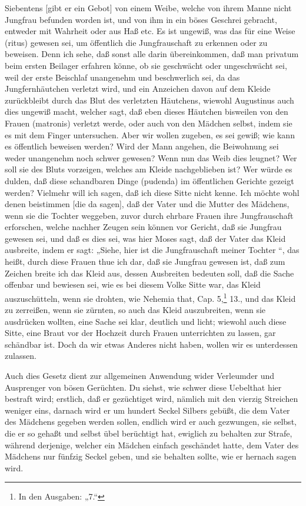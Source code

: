 Siebentens [gibt er ein Gebot] von einem Weibe, welche von ihrem Manne nicht Jungfrau befunden worden ist, und von ihm in ein böses Geschrei gebracht, entweder mit Wahrheit oder aus Haß etc. Es ist ungewiß, was das für eine Weise (ritus) gewesen sei, um öffentlich die Jungfrauschaft zu erkennen oder zu beweisen. Denn ich sehe, daß sonst alle darin übereinkommen, daß man privatum beim ersten Beilager erfahren könne, ob sie geschwächt oder ungeschwächt sei, weil der erste Beischlaf unangenehm und beschwerlich sei, da das Jungfernhäutchen verletzt wird, und ein Anzeichen davon auf dem Kleide zurückbleibt durch das Blut des verletzten Häutchens, wiewohl Augustinus auch dies ungewiß macht, welcher sagt, daß eben dieses Häutchen bisweilen von den Frauen (matronis) verletzt werde, oder auch von den Mädchen selbst, indem sie es mit dem Finger untersuchen. Aber wir wollen zugeben, es sei gewiß; wie kann es öffentlich beweisen werden? Wird der Mann angehen, die Beiwohnung sei weder unangenehm noch schwer gewesen? Wenn nun das Weib dies leugnet? Wer soll sie des Bluts vorzeigen, welches am Kleide nachgeblieben ist? Wer würde es dulden, daß diese schandbaren Dinge (pudenda) im öffentlichen Gerichte gezeigt werden? Vielmehr will ich sagen, daß ich diese Sitte nicht kenne. Ich möchte wohl denen beistimmen [die da sagen], daß der Vater und die Mutter des Mädchens, wenn sie die Tochter weggeben, zuvor durch ehrbare Frauen ihre Jungfrauschaft erforschen, welche nachher Zeugen sein können vor Gericht, daß sie Jungfrau gewesen sei, und daß es dies sei, was hier Moses sagt, daß der Vater das Kleid ausbreite, indem er sagt: „Siehe, hier ist die Jungfrauschaft meiner Tochter
“, das heißt, durch diese Frauen thue ich dar, daß sie Jungfrau gewesen ist, daß zum Zeichen breite ich das Kleid aus, dessen Ausbreiten bedeuten soll, daß die Sache offenbar und bewiesen sei, wie es bei diesem Volke Sitte war, das Kleid auszuschütteln, wenn sie drohten, wie Nehemia that, Cap. 5,\footnote{In den Ausgaben: „7.“} 13., und das Kleid zu zerreißen, wenn sie zürnten, so auch das Kleid auszubreiten, wenn sie ausdrücken wollten, eine Sache sei klar, deutlich und licht; wiewohl auch diese Sitte, eine Braut vor der Hochzeit durch Frauen unterrichten zu lassen, gar schändbar ist. Doch da wir etwas Anderes nicht haben, wollen wir es unterdessen zulassen.

Auch dies Gesetz dient zur allgemeinen Anwendung wider Verleumder und Ausprenger von bösen Gerüchten. Du siehst, wie schwer diese Uebelthat hier bestraft wird; erstlich, daß er gezüchtiget wird, nämlich mit den vierzig Streichen weniger eins, darnach wird er um hundert Seckel Silbers gebüßt, die dem Vater des Mädchens gegeben werden sollen, endlich wird er auch gezwungen, sie selbst, die er so gehaßt und selbst übel berüchtigt hat, ewiglich zu behalten zur Strafe, während derjenige, welcher ein Mädchen einfach geschändet hatte, dem Vater des Mädchens nur fünfzig Seckel geben, und sie behalten sollte, wie er hernach sagen wird.


